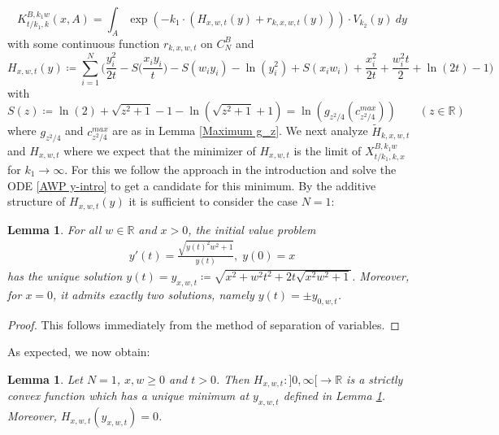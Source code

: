 \documentclass[reqno]{amsart}
\theoremstyle{plain}
\newtheorem{lemma}[theorem]{Lemma}
\theoremstyle{definition}
\numberwithin{equation}{section}
\newcommand{\R}{\mathbb{R}}
\begin{document}
\begin{equation}\label{K-Schlange}
K_{t/k_1,k}^{B,k_1 w}(x,A) 
=\int_A \exp( -k_1 \cdot (  H_{x,w,t}(y) + r_{k,x,w,t}(y) ) ) \cdot V_{k_2}(y) \> dy
\end{equation}
with some continuous function  $r_{k,x,w,t}$ on $C_N^B$ and
$$H_{x,w,t}(y) \coloneqq \sum\limits_{i=1}^N \bigg( \frac{y_i^2}{2t}-S\Big(\frac{x_iy_i}{t}\Big)-S(w_i y_i)-\ln(y_i^2)+S(x_i w_i)+\frac{x_i^2}{2t}+\frac{w_i^2t}{2}+\ln(2t)-1 \bigg)$$
with
$$S(z)\coloneqq\ln(2) + \sqrt{z^2+1} -1 - \ln(\sqrt{z^2+1}+1)=\ln(g_{z^2/4}(c^{max}_{z^2/4})) \quad\quad (z \in \R) $$
where $g_{z^2/4}$ and $c^{max}_{z^2/4}$ are as in Lemma \ref{Maximum g_z}.
We next analyze $\widetilde{H}_{k,x,w,t}$ and $H_{x,w,t}$
where we expect that the minimizer of $H_{x,w,t}$ is the limit of $X^{B,k_1w}_{t/k_1,k,x}$ for $k_1 \to \infty$.
For this we
follow the approach in the introduction and  solve the ODE \eqref{AWP y-intro} to get a candidate for this minimum.
By the additive structure of $H_{x,w,t}(y)$ it is sufficient to consider  the case $N=1$:

\begin{lemma}\label{DGL y}
For all $w \in \R$ and $x > 0$, the initial value problem
\begin{align*}
y'(t)=\frac{\sqrt{y(t)^2w^2+1}}{y(t)}, \; y(0)=x \label{AWP y}
\end{align*}
has the unique solution $y(t) = y_{x,w,t} \coloneqq \sqrt{x^2 + w^2 t^2 + 2t \sqrt{x^2 w^2 + 1}}$.
Moreover, for $x=0$, it admits exactly two solutions, namely $y(t)=\pm y_{0,w,t}$.
\end{lemma}

\begin{proof} This follows immediately from the method of separation of variables.
\end{proof}

As expected, we now obtain:

\begin{lemma}\label{Minimum H}
Let $N=1$, $x,w \geq 0$ and $t>0$. Then
 $H_{x,w,t}:]0,\infty[\to\mathbb R$ is a strictly convex function which has a unique minimum at  $y_{x,w,t}$ defined in Lemma \ref{DGL y}. 
     Moreover, $H_{x,w,t}(y_{x,w,t})=0$.
     \end{lemma}
\end{document}

